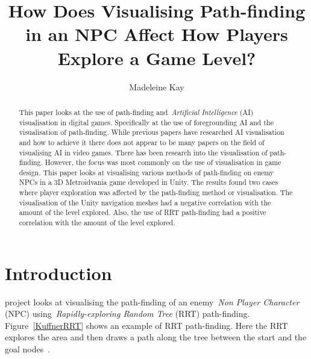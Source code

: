 \documentclass[journal]{IEEEtran}
\begin{document}
	\title{ How Does Visualising Path-finding in an NPC Affect How Players Explore a Game Level?}
	\author{Madeleine Kay}
	
	
	\maketitle
	
	\begin{abstract}
		This paper looks at the use of path-finding and~\textit{Artificial Intelligence} (AI) visualisation in digital games.   Specifically at the use of foregrounding AI and the visualisation of path-finding. 
		While previous papers have researched AI visualisation and how to achieve it there does not appear to be many papers on the field of visualising AI in video games. There has been research into the visualisation of path-finding. However, the focus was most commonly on the use of visualisation in game design. 
		This paper looks at visualising various methods of path-finding on enemy NPCs in a 3D Metroidvania game developed in Unity.
		The results found two cases where player exploration was affected by the path-finding method or visualisation. The visualisation of the Unity navigation meshes had a negative correlation with the amount of the level explored. Also, the use of RRT path-finding had a positive correlation with the amount of the level explored. 
		
	\end{abstract}
	
	\section{Introduction} \label{introduction}
	 project looks at visualising the path-finding of an enemy~\textit{Non Player Character} (NPC) using~\textit{Rapidly-exploring Random Tree} (RRT) path-finding.  Figure~\ref{KuffnerRRT} shows an example of RRT path-finding. Here the RRT explores the area and then draws a path along the tree between the start and the goal nodes~\cite{Kuffner2000}. 
	
\end{document}
